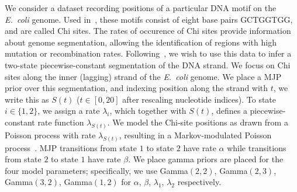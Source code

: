 {\begin{figure}
  \end{figure}
  We consider a dataset recording positions of a particular DNA motif 
  on the {\em E.\ coli} genome. Used in~\cite{FearnSher2006}, these 
  motifs consist of eight base pairs GCTGGTGG, and are called Chi sites.
  The rates of occurence of Chi sites provide information about genome 
  segmentation, allowing the identification of regions with high 
  mutation or recombination rates.
  Following~\cite{FearnSher2006}, we wish to use this data to infer a 
  two-state piecewise-constant segmentation of the DNA strand. 
  We focus on Chi sites along the inner (lagging) strand of the 
  {\em E.\ coli} genome.  We place a 
  MJP prior over this segmentation, and indexing position along the 
  strand with $t$, we write this as $S(t)$ ($t \in [0,20]$ after rescaling 
  nucleotide indices). To state $i \in 
  \{1,2\}$, we assign a rate $\lambda_i$, which together with $S(t)$, 
  defines a piecewise-constant rate function $\lambda_{S(t)}$. We model 
  the Chi-site positions as drawn from a Poisson process with rate 
  $\lambda_{S(t)}$, resulting in a {Markov-modulated Poisson 
  process}~\citep{scottmmpp03}. 
  MJP transitions from state $1$ to state $2$ have rate $\alpha$ while 
  transitions from state $2$ to state $1$ have rate $\beta$. We place 
  gamma priors are placed for the four model parameters; specifically, 
  we use Gamma$(2,2)$, Gamma$(2,3)$, Gamma$(3,2)$, Gamma$(1,2)$ for 
  $\alpha$, $\beta$, $\lambda_1$, $\lambda_2$ respectively.

}
